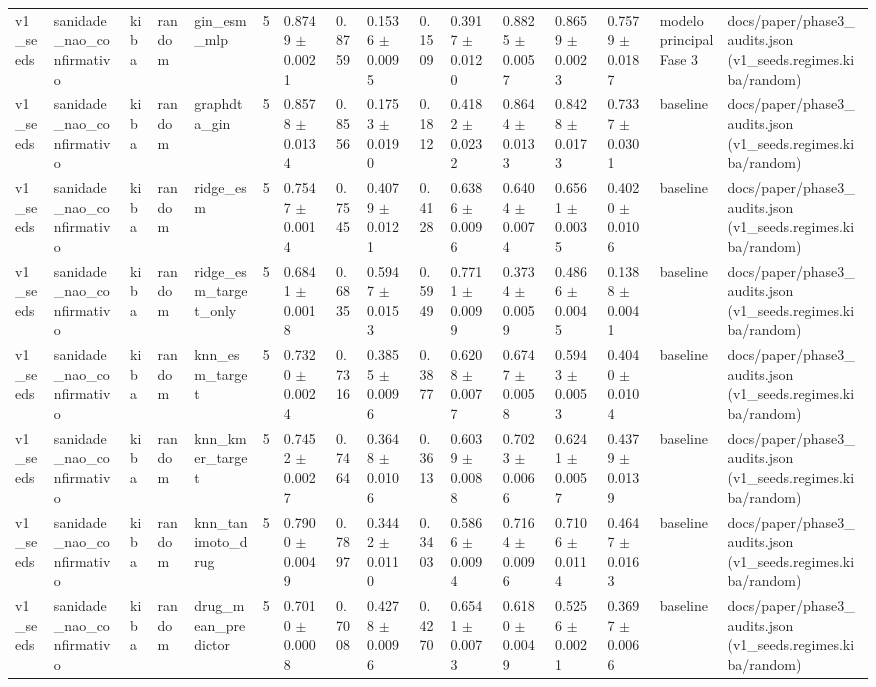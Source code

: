 \begin{table}[htbp]
\begin{tabular}{llllllllllllllll}
v1\_seeds & sanidade\_nao\_confirmativo & kiba & random & gin\_esm\_mlp & 5 & 0.8749 $\pm$ 0.0021 & 0.8759 & 0.1536 $\pm$ 0.0095 & 0.1509 & 0.3917 $\pm$ 0.0120 & 0.8825 $\pm$ 0.0057 & 0.8659 $\pm$ 0.0023 & 0.7579 $\pm$ 0.0187 & modelo principal Fase 3 & docs/paper/phase3\_audits.json (v1\_seeds.regimes.kiba/random) \\
v1\_seeds & sanidade\_nao\_confirmativo & kiba & random & graphdta\_gin & 5 & 0.8578 $\pm$ 0.0134 & 0.8556 & 0.1753 $\pm$ 0.0190 & 0.1812 & 0.4182 $\pm$ 0.0232 & 0.8644 $\pm$ 0.0133 & 0.8428 $\pm$ 0.0173 & 0.7337 $\pm$ 0.0301 & baseline & docs/paper/phase3\_audits.json (v1\_seeds.regimes.kiba/random) \\
v1\_seeds & sanidade\_nao\_confirmativo & kiba & random & ridge\_esm & 5 & 0.7547 $\pm$ 0.0014 & 0.7545 & 0.4079 $\pm$ 0.0121 & 0.4128 & 0.6386 $\pm$ 0.0096 & 0.6404 $\pm$ 0.0074 & 0.6561 $\pm$ 0.0035 & 0.4020 $\pm$ 0.0106 & baseline & docs/paper/phase3\_audits.json (v1\_seeds.regimes.kiba/random) \\
v1\_seeds & sanidade\_nao\_confirmativo & kiba & random & ridge\_esm\_target\_only & 5 & 0.6841 $\pm$ 0.0018 & 0.6835 & 0.5947 $\pm$ 0.0153 & 0.5949 & 0.7711 $\pm$ 0.0099 & 0.3734 $\pm$ 0.0059 & 0.4866 $\pm$ 0.0045 & 0.1388 $\pm$ 0.0041 & baseline & docs/paper/phase3\_audits.json (v1\_seeds.regimes.kiba/random) \\
v1\_seeds & sanidade\_nao\_confirmativo & kiba & random & knn\_esm\_target & 5 & 0.7320 $\pm$ 0.0024 & 0.7316 & 0.3855 $\pm$ 0.0096 & 0.3877 & 0.6208 $\pm$ 0.0077 & 0.6747 $\pm$ 0.0058 & 0.5943 $\pm$ 0.0053 & 0.4040 $\pm$ 0.0104 & baseline & docs/paper/phase3\_audits.json (v1\_seeds.regimes.kiba/random) \\
v1\_seeds & sanidade\_nao\_confirmativo & kiba & random & knn\_kmer\_target & 5 & 0.7452 $\pm$ 0.0027 & 0.7464 & 0.3648 $\pm$ 0.0106 & 0.3613 & 0.6039 $\pm$ 0.0088 & 0.7023 $\pm$ 0.0066 & 0.6241 $\pm$ 0.0057 & 0.4379 $\pm$ 0.0139 & baseline & docs/paper/phase3\_audits.json (v1\_seeds.regimes.kiba/random) \\
v1\_seeds & sanidade\_nao\_confirmativo & kiba & random & knn\_tanimoto\_drug & 5 & 0.7900 $\pm$ 0.0049 & 0.7897 & 0.3442 $\pm$ 0.0110 & 0.3403 & 0.5866 $\pm$ 0.0094 & 0.7164 $\pm$ 0.0096 & 0.7106 $\pm$ 0.0114 & 0.4647 $\pm$ 0.0163 & baseline & docs/paper/phase3\_audits.json (v1\_seeds.regimes.kiba/random) \\
v1\_seeds & sanidade\_nao\_confirmativo & kiba & random & drug\_mean\_predictor & 5 & 0.7010 $\pm$ 0.0008 & 0.7008 & 0.4278 $\pm$ 0.0096 & 0.4270 & 0.6541 $\pm$ 0.0073 & 0.6180 $\pm$ 0.0049 & 0.5256 $\pm$ 0.0021 & 0.3697 $\pm$ 0.0066 & baseline & docs/paper/phase3\_audits.json (v1\_seeds.regimes.kiba/random) \\

\end{tabular}
\end{table}
